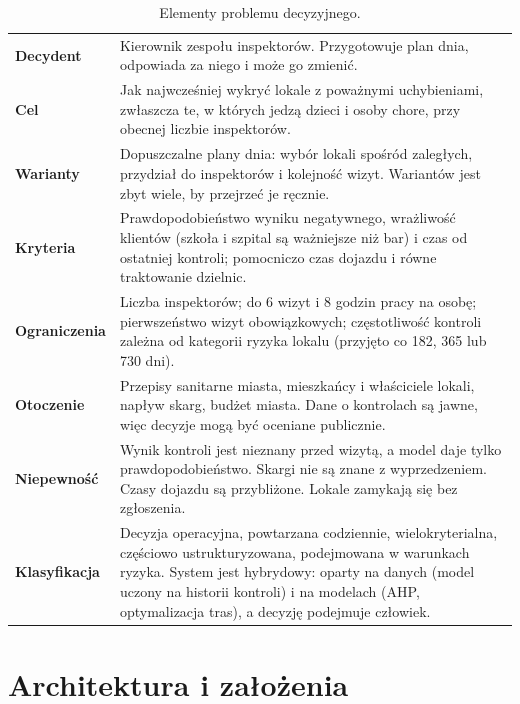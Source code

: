 \documentclass[11pt,a4paper]{article}
\begin{document}
\begin{table}[ht]
\centering\small
\caption{Elementy problemu decyzyjnego.}
\label{tab:problem}
\begin{tabularx}{\textwidth}{@{}>{\bfseries}p{2.6cm}X@{}}
\toprule
Decydent & Kierownik zespołu inspektorów. Przygotowuje plan dnia, odpowiada za niego i może go
  zmienić. \\
Cel & Jak najwcześniej wykryć lokale z poważnymi uchybieniami, zwłaszcza te, w których jedzą
  dzieci i osoby chore, przy obecnej liczbie inspektorów. \\
Warianty & Dopuszczalne plany dnia: wybór lokali spośród zaległych, przydział do inspektorów
  i kolejność wizyt. Wariantów jest zbyt wiele, by przejrzeć je ręcznie. \\
Kryteria & Prawdopodobieństwo wyniku negatywnego, wrażliwość klientów (szkoła i szpital są
  ważniejsze niż bar) i czas od ostatniej kontroli; pomocniczo czas dojazdu i równe traktowanie dzielnic. \\
Ograniczenia & Liczba inspektorów; do 6 wizyt i 8 godzin pracy na osobę; pierwszeństwo wizyt
  obowiązkowych; częstotliwość kontroli zależna od kategorii ryzyka lokalu (przyjęto co 182,
  365 lub 730 dni). \\
Otoczenie & Przepisy sanitarne miasta, mieszkańcy i właściciele lokali, napływ skarg,
  budżet miasta. Dane o kontrolach są jawne, więc decyzje mogą być oceniane publicznie. \\
Niepewność & Wynik kontroli jest nieznany przed wizytą, a model daje tylko prawdopodobieństwo.
  Skargi nie są znane z wyprzedzeniem. Czasy dojazdu są przybliżone. Lokale zamykają się bez
  zgłoszenia. \\
Klasyfikacja & Decyzja operacyjna, powtarzana codziennie, wielokryterialna, częściowo
  ustrukturyzowana, podejmowana w warunkach ryzyka. System jest hybrydowy: oparty na danych
  (model uczony na historii kontroli) i na modelach (AHP, optymalizacja tras), a decyzję
  podejmuje człowiek. \\
\bottomrule
\end{tabularx}
\end{table}

\section{Architektura i założenia}
\end{document}
